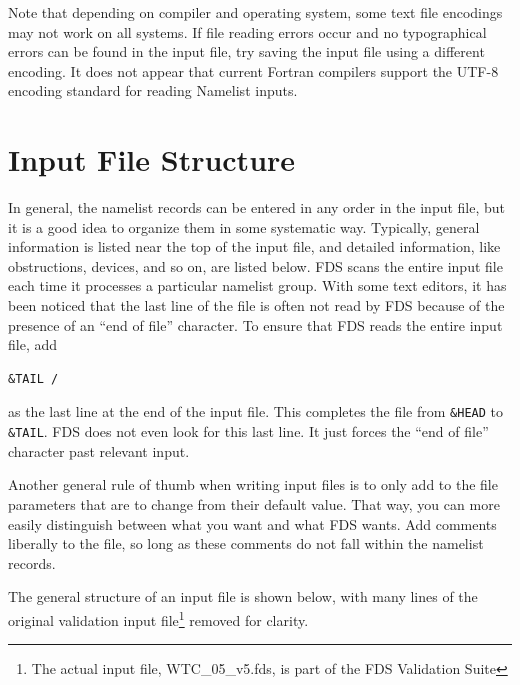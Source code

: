 \documentclass[11pt]{book}
\newcommand{\ct}{\tt\small}
\begin{document}
\begin{warning}
\noindent
Note that depending on compiler and operating system, some text file encodings may not work on all systems.
If file reading errors occur and no typographical errors can be found in the input file, try saving the input file using a different encoding.
It does not appear that current Fortran compilers support the UTF-8 encoding standard for reading Namelist inputs.
\end{warning}



\section{Input File Structure}

In general, the namelist records can be entered in any order in the input file, but it is a good idea to organize them
in some systematic way. Typically, general information is listed near the top of the input file, and detailed information, like
obstructions, devices, and so on, are listed below. FDS scans the entire input file each time it processes a particular namelist group.
With some text editors, it has been noticed that the last line of the file is often not read by FDS because of the presence of an
``end of file'' character.
To ensure that FDS reads the entire input file, add

\footnotesize
\begin{verbatim}
&TAIL /
\end{verbatim}
\normalsize \noindent
as the last line at the end of the input file. This completes the file from {\ct \&HEAD} to {\ct \&TAIL}. FDS does not even look for
this last line. It just forces the ``end of file'' character past relevant input.

Another general rule of thumb when writing input files is to only add to the file parameters that are to change from their
default value. That way, you can more easily distinguish between what you want and what FDS wants.
Add comments liberally to the file, so long as
these comments do not fall within the namelist records.

The general structure of an input file is shown below, with many
lines of the original validation input file\footnote{The actual input file, WTC\_05\_v5.fds, is part of the FDS
Validation Suite} removed for clarity.
\end{document}
